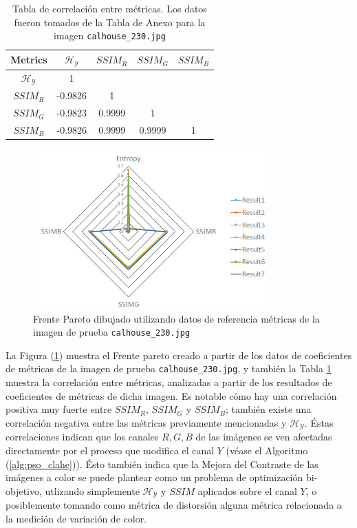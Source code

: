 \begin{table}[H]
\setlength{\abovecaptionskip}{2pt plus 3pt minus 2pt} %
\caption[Parámetros de entrada para $MOPSO$]{Tabla de correlación entre métricas. Los datos fueron tomados de la Tabla de Anexo para la imagen \texttt{calhouse\_230.jpg}}
\begin{center}
 \begin{tabular}{||c | c c c c||} 
 \hline
Metrics & $\mathscr{H_Y}$ & $SSIM_R$ & $SSIM_G$ & $SSIM_B$ \\ 
\hline
$\mathscr{H_Y}$ & 1 &   &   &  \\ 
\hline
$SSIM_R$ & -0.9826  & 1 &  &  \\ 
\hline
$SSIM_G$ & -0.9823 & 0.9999   & 1   &  \\ 
\hline
$SSIM_B$ & -0.9826 & 0.9999   & 0.9999   & 1 \\ 
\hline
\end{tabular}
\end{center}
\label{table:correlacion}
\end{table}

\begin{figure}[H]
    \centering
        \includegraphics[width=0.80\textwidth]{./Figures/pareto_front.jpg}
    \caption{Frente Pareto dibujado utilizando datos de referencia métricas de la imagen de prueba \texttt{calhouse\_230.jpg} }\label{fig:pareto_front}
\end{figure}


La Figura (\ref{fig:pareto_front}) muestra el Frente pareto creado a partir de los datos de coeficientes de métricas de la imagen de prueba \texttt{calhouse\_230.jpg}, y también la Tabla \ref{table:correlacion} muestra la correlación entre métricas, analizadas a partir de los resultados de coeficientes de métricas de dicha imagen. Es notable cómo hay una correlación positiva muy fuerte entre $SSIM_R$, $SSIM_G$ y $SSIM_B$; también existe una correlación negativa entre las métricas previamente mencionadas y $\mathscr{H_Y}$. Éstas correlaciones indican que los canales  $R,G,B$ de las imágenes se ven afectadas directamente por el proceso que modifica el canal $Y$ (véase el Algoritmo (\ref{alg:pso_clahe})). Ésto también indica que la Mejora del Contraste de las imágenes a color se puede plantear como un problema de optimización bi-objetivo, utlizando simplemente $\mathscr{H_Y}$ y $SSIM$ aplicados sobre el canal $Y$, o posiblemente tomando como métrica de distorsión alguna métrica relacionada a la medición de variación de color.

